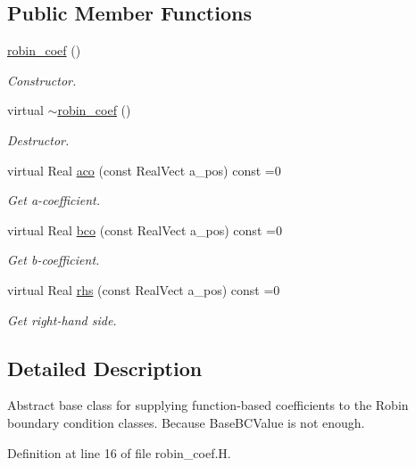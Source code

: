 \subsection*{Public Member Functions}
\begin{DoxyCompactItemize}
\item 
\hyperlink{classrobin__coef_abb8fb6513875f78f5abbbe19ad23e75f}{robin\+\_\+coef} ()
\begin{DoxyCompactList}\small\item\em Constructor. \end{DoxyCompactList}\item 
virtual \hyperlink{classrobin__coef_a146613c83e1507cb2e18303191d78679}{$\sim$robin\+\_\+coef} ()
\begin{DoxyCompactList}\small\item\em Destructor. \end{DoxyCompactList}\item 
virtual Real \hyperlink{classrobin__coef_a0770f01660699dcbc7c610e7d851e9e5}{aco} (const Real\+Vect a\+\_\+pos) const =0
\begin{DoxyCompactList}\small\item\em Get a-\/coefficient. \end{DoxyCompactList}\item 
virtual Real \hyperlink{classrobin__coef_a1bc117783a16f2e97e2a146bcfea1318}{bco} (const Real\+Vect a\+\_\+pos) const =0
\begin{DoxyCompactList}\small\item\em Get b-\/coefficient. \end{DoxyCompactList}\item 
virtual Real \hyperlink{classrobin__coef_a42b98d3d26ec08dd3a8d9b7539445f93}{rhs} (const Real\+Vect a\+\_\+pos) const =0
\begin{DoxyCompactList}\small\item\em Get right-\/hand side. \end{DoxyCompactList}\end{DoxyCompactItemize}


\subsection{Detailed Description}
Abstract base class for supplying function-\/based coefficients to the Robin boundary condition classes. Because Base\+B\+C\+Value is not enough. 

Definition at line 16 of file robin\+\_\+coef.\+H.



